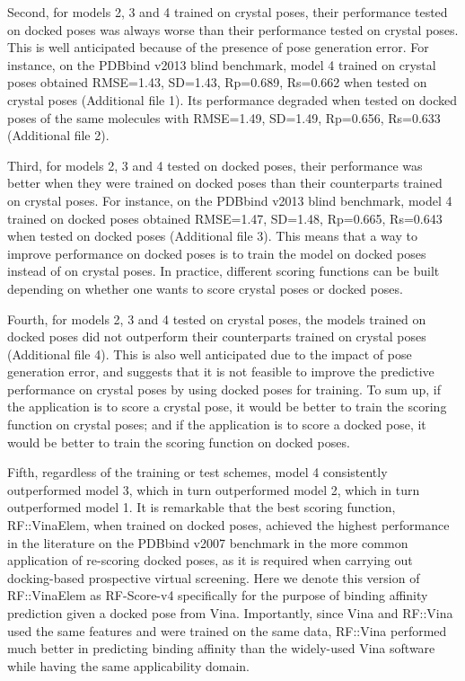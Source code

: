 \documentclass[twocolumn]{bmcart}
\begin{document}
Second, for models 2, 3 and 4 trained on crystal poses, their performance tested on docked poses was always worse than their performance tested on crystal poses. This is well anticipated because of the presence of pose generation error. For instance, on the PDBbind v2013 blind benchmark, model 4 trained on crystal poses obtained RMSE=1.43, SD=1.43, Rp=0.689, Rs=0.662 when tested on crystal poses (Additional file 1). Its performance degraded when tested on docked poses of the same molecules with RMSE=1.49, SD=1.49, Rp=0.656, Rs=0.633 (Additional file 2).

Third, for models 2, 3 and 4 tested on docked poses, their performance was better when they were trained on docked poses than their counterparts trained on crystal poses. For instance, on the PDBbind v2013 blind benchmark, model 4 trained on docked poses obtained RMSE=1.47, SD=1.48, Rp=0.665, Rs=0.643 when tested on docked poses (Additional file 3). This means that a way to improve performance on docked poses is to train the model on docked poses instead of on crystal poses. In practice, different scoring functions can be built depending on whether one wants to score crystal poses or docked poses.

Fourth, for models 2, 3 and 4 tested on crystal poses, the models trained on docked poses did not outperform their counterparts trained on crystal poses (Additional file 4). This is also well anticipated due to the impact of pose generation error, and suggests that it is not feasible to improve the predictive performance on crystal poses by using docked poses for training. To sum up, if the application is to score a crystal pose, it would be better to train the scoring function on crystal poses; and if the application is to score a docked pose, it would be better to train the scoring function on docked poses.

Fifth, regardless of the training or test schemes, model 4 consistently outperformed model 3, which in turn outperformed model 2, which in turn outperformed model 1. It is remarkable that the best scoring function, RF::VinaElem, when trained on docked poses, achieved the highest performance in the literature on the PDBbind v2007 benchmark in the more common application of re-scoring docked poses, as it is required when carrying out docking-based prospective virtual screening. Here we denote this version of RF::VinaElem as RF-Score-v4 specifically for the purpose of binding affinity prediction given a docked pose from Vina. Importantly, since Vina and RF::Vina used the same features and were trained on the same data, RF::Vina performed much better in predicting binding affinity than the widely-used Vina software while having the same applicability domain.
\end{document}
